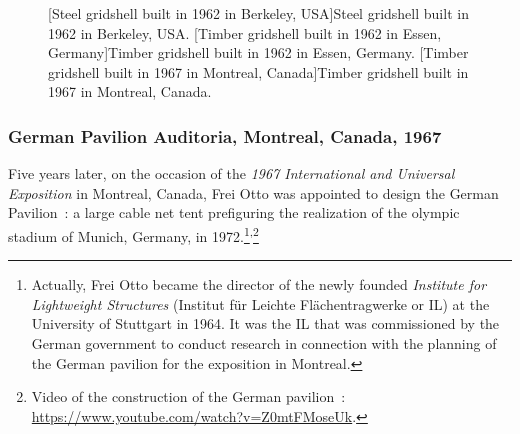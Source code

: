 \begin{figure}[p]
     	\centering
	\begin{fullpage}
		\hspace*{\fill}
		\vspace{10pt}
		[Steel gridshell built in 1962 in Berkeley, USA]{Steel gridshell built in 1962 in Berkeley, USA.}
		\label{fig:berkeley}    
		\vspace{0.5cm}
		\hspace*{\fill}
		\vspace{10pt}
		[Timber gridshell built in 1962 in Essen, Germany]{Timber gridshell built in 1962 in Essen, Germany.}
		\label{fig:essen}    
		\vspace{0.5cm}
		\hspace*{\fill}
		\vspace{10pt}
		[Timber gridshell built in 1967 in Montreal, Canada]{Timber gridshell built in 1967 in Montreal, Canada.}
		\label{fig:montreal}    
	\end{fullpage}
\end{figure}

\subsubsection{German Pavilion Auditoria, Montreal, Canada, 1967}
Five years later, on the occasion of the \emph{1967 International and Universal Exposition} in Montreal, Canada, Frei Otto was appointed to design the German Pavilion~: a large cable net tent prefiguring the realization of the olympic stadium of Munich, Germany, in 1972.\footnote{Actually, Frei Otto became the director of the newly founded \emph{Institute for Lightweight Structures} (Institut für Leichte Flächentragwerke or IL) at the University of Stuttgart in 1964. It was the IL that was commissioned by the German government to conduct research in connection with the planning of the German pavilion for the exposition in Montreal.}\textsuperscript{,}\footnote{Video of the construction of the German pavilion~: \url{https://www.youtube.com/watch?v=Z0mtFMoseUk}.} 


